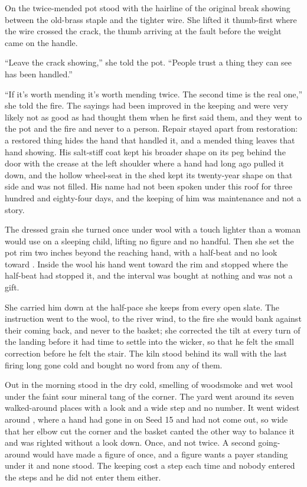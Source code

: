 On  the twice-mended pot stood with the hairline of the original break showing between the old-brass staple and the tighter wire. She lifted it thumb-first where the wire crossed the crack, the thumb arriving at the fault before the weight came on the handle.

“Leave the crack showing,” she told the pot. “People trust a thing they can see has been handled.”

“If it's worth mending it's worth mending twice. The second time is the real one,” she told the fire. The sayings had been improved in the keeping and were very likely not as good as  had thought them when he first said them, and they went to the pot and the fire and never to a person. Repair stayed apart from restoration: a restored thing hides the hand that handled it, and a mended thing leaves that hand showing. His salt-stiff coat kept his broader shape on its peg behind the door with the crease at the left shoulder where a hand had long ago pulled it down, and the hollow wheel-seat in the shed kept its twenty-year shape on that side and was not filled. His name had not been spoken under this roof for three hundred and eighty-four days, and the keeping of him was maintenance and not a story.

The dressed grain she turned once under wool with a touch lighter than a woman would use on a sleeping child, lifting no figure and no handful. Then she set the pot rim two inches beyond the reaching hand, with a half-beat and no look toward . Inside the wool his hand went toward the rim and stopped where the half-beat had stopped it, and the interval was bought at nothing and was not a gift.

\scenebreak

She carried him down  at the half-pace she keeps from every open slate. The instruction went to the wool, to the river wind, to the fire she would bank against their coming back, and never to the basket; she corrected the tilt at every turn of the landing before it had time to settle into the wicker, so that he felt the small correction before he felt the stair. The kiln stood behind its wall with the last firing long gone cold and bought no word from any of them.

Out in  the morning stood in the dry cold, smelling of woodsmoke and wet wool under the faint sour mineral tang of the corner. The yard went around its seven walked-around places with a look and a wide step and no number. It went widest around , where a hand had gone in on Seed 15 and had not come out, so wide that her elbow cut the corner and the basket canted the other way to balance it and was righted without a look down. Once, and not twice. A second going-around would have made a figure of once, and a figure wants a payer standing under it and none stood. The keeping cost a step each time and nobody entered the steps and he did not enter them either.

